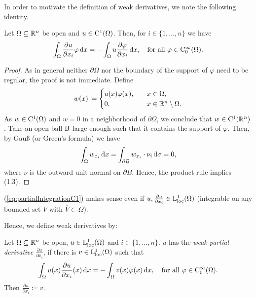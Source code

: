 In order to motivate the definition of weak derivatives, we note the following identity.

\begin{lem}
  \label{lem:partialIntegrationC1}
  Let $\Omega \subseteq \mathbb{R}^n$ be open and $u \in \mathrm{C}^1(\Omega)$. 
  Then, for $i \in \{1,\dots,n\}$ we have
  \begin{equation}
    \label{eq:partialIntegrationC1}
    \int_\Omega \frac{\partial u}{\partial x_i} \varphi \, {\operatorname{d}\!{x}} = -\int_\Omega u \frac{\partial \varphi}{\partial x_i} \, {\operatorname{d}\!{x}}, \quad \text{for all } \varphi \in \mathrm{C}_0^\infty(\Omega).
  \end{equation}
\end{lem}
\begin{proof}
  As in general neither $\partial \Omega$ nor the boundary of the support of $\varphi$ need to be regular, the proof is not immediate.
  Define
  $$
  w(x) \coloneqq  \begin{cases} u(x) \varphi(x), \quad &x \in \Omega, \\
    0, \quad &x \in \mathbb{R}^n \setminus \Omega .\end{cases}
  $$
  As $w \in \mathrm{C}^1(\Omega)$ and $w = 0$ in a neighborhood of $\partial \Omega$, we conclude that $w \in \mathrm{C}^1(\mathbb{R}^n)$.
  Take an open ball $\mathrm{B}$ large enough such that it contains the support of $\varphi$. 
  Then, by Gauß (or Green's formula) we have
  $$
  \int_\Omega w_{x_i} \, {\operatorname{d}\!{x}} 
  = \int_{\partial B} w_{x_i} \cdot \nu_i \, {\operatorname{d}\!{\sigma}} = 0,
  $$
  where $\nu$ is the outward unit normal on $\partial B$.
  Hence, the product rule implies (1.3).
\end{proof}
(\ref{eq:partialIntegrationC1}) makes sense even if $u, \frac{\partial u}{\partial x_i} \in \mathrm{L}_{\operatorname{loc}}^1(\Omega)$ (integrable on any bounded set $V$ with $\overline V \subset \Omega$).

Hence, we define weak derivatives by:

\begin{defn}
  Let $\Omega \subseteq \mathbb{R}^n$ be open, $u \in \mathrm{L}_{\operatorname{loc}}^1(\Omega)$ and $i \in \{1,\dots,n\}$.
  $u$ has the \emph{weak partial derivative} $\frac{\partial u}{\partial x_i}$, if there is $v \in \mathrm{L}_{\operatorname{loc}}^1(\Omega)$ such that
  \begin{equation}
    \label{eq:weakDerivativeDef}
    \int_\Omega u(x) \frac{\partial u}{\partial x_i}(x) \, {\operatorname{d}\!{x}} = -\int_\Omega v(x) \varphi(x) \, {\operatorname{d}\!{x}}, \quad \text{for all } \varphi \in \mathrm{C}_0^\infty(\Omega).    
  \end{equation}
  Then $\frac{\partial u}{\partial x_i} \coloneqq v$.
\end{defn}

